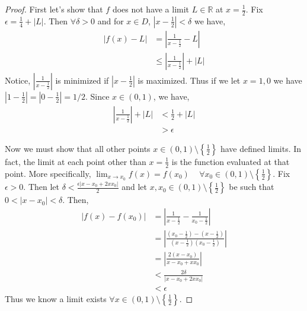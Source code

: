 \documentclass[leqno]{article}
\theoremstyle{nonumberplain}
\newtheorem{proof}{Proof}
\begin{document}
\begin{proof}
First let's show that $f$ does not have a limit $L\in \mathbb{R}$ at $x=\frac{1}{2}$. Fix $\epsilon = \frac{1}{4} + |L|$.  Then $\forall \delta > 0$ and for $x\in D$, $|x-\frac{1}{2}|<\delta$ we have,
\begin{align*}
|f(x)-L| &= \left| \frac{1}{x-\frac{1}{2}} -L\right|\\
&\leq \left| \frac{1}{x-\frac{1}{2}} \right| + |L|
\end{align*}
Notice, $\left|\frac{1}{x-\frac{1}{2}}\right|$ is minimized if $\left|x-\frac{1}{2}\right|$ is maximized. Thus if we let $x=1,0$ we have $\left|1-\frac{1}{2}\right| = \left|0-\frac{1}{2}\right| = 1/2$.  Since $x \in (0,1)$, we have,
\begin{align*}
\left| \frac{1}{x-\frac{1}{2}} \right| + |L| &< \frac{1}{2}+|L|\\
&>\epsilon
\end{align*}

Now we must show that all other points $x \in (0,1)\setminus \left\{\frac{1}{2}\right\}$ have defined limits. In fact, the limit at each point other than $x=\frac{1}{2}$ is the function evaluated at that point. More specifically,  $\lim_{x\to x_0}f(x)=f(x_0)$ ~ $\forall x_0 \in (0,1)\setminus \left\{\frac{1}{2}\right\}$. Fix $\epsilon >0$. Then let $\delta < \frac{\epsilon |x-x_0+2xx_0|}{2}$ and let $x,x_0 \in (0,1)\setminus \left\{\frac{1}{2}\right\}$ be such that $0<|x-x_0|<\delta$. Then,
\begin{align*}
|f(x)-f(x_0)|&=\left| \frac{1}{x-\frac{1}{2}} - \frac{1}{x_0-\frac{1}{2}}\right|\\
&= \left| \frac{\left(x_0-\frac{1}{2}\right)-\left(x-\frac{1}{2}\right)}{\left(x-\frac{1}{2}\right)\left(x_0-\frac{1}{2}\right)}\right|\\
&=\left| \frac{2(x-x_0)}{x-x_0+xx_0}\right|\\
&< \frac{2\delta}{|x-x_0+2xx_0|}\\
&<\epsilon
\end{align*} 
Thus we know a limit exists $\forall x \in (0,1)\setminus \left\{\frac{1}{2}\right\}$.  
\end{proof}

\pagebreak



\end{document}

